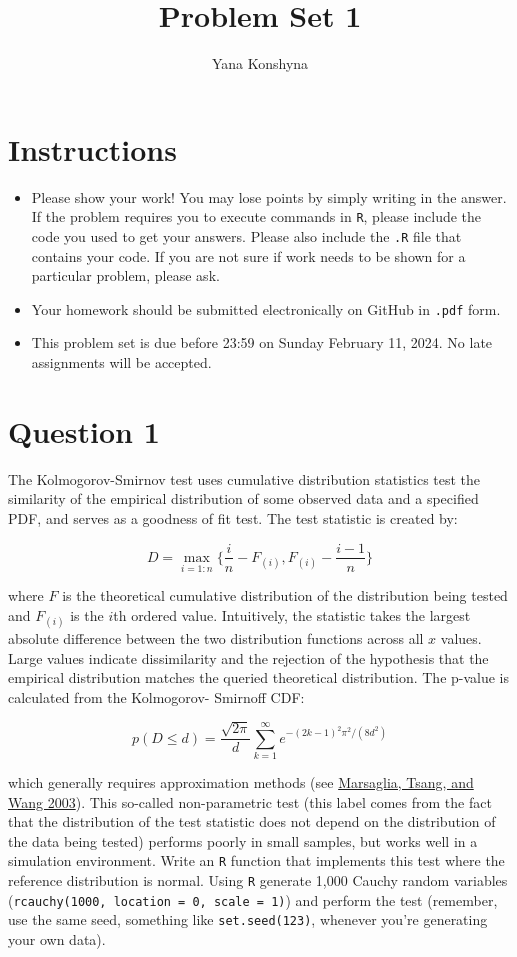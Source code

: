 \documentclass[12pt,letterpaper]{article}
\title{Problem Set 1}
\author{Yana Konshyna}
\begin{document}
	\maketitle
	\section*{Instructions}
	\begin{itemize}
	\item Please show your work! You may lose points by simply writing in the answer. If the problem requires you to execute commands in \texttt{R}, please include the code you used to get your answers. Please also include the \texttt{.R} file that contains your code. If you are not sure if work needs to be shown for a particular problem, please ask.
\item Your homework should be submitted electronically on GitHub in \texttt{.pdf} form.
\item This problem set is due before 23:59 on Sunday February 11, 2024. No late assignments will be accepted.
	\end{itemize}

	\vspace{.25cm}
\section*{Question 1} 
\vspace{.25cm}
\noindent The Kolmogorov-Smirnov test uses cumulative distribution statistics test the similarity of the empirical distribution of some observed data and a specified PDF, and serves as a goodness of fit test. The test statistic is created by:

$$D = \max_{i=1:n} \Big\{ \frac{i}{n}  - F_{(i)}, F_{(i)} - \frac{i-1}{n} \Big\}$$

\noindent where $F$ is the theoretical cumulative distribution of the distribution being tested and $F_{(i)}$ is the $i$th ordered value. Intuitively, the statistic takes the largest absolute difference between the two distribution functions across all $x$ values. Large values indicate dissimilarity and the rejection of the hypothesis that the empirical distribution matches the queried theoretical distribution. The p-value is calculated from the Kolmogorov-
Smirnoff CDF:

$$p(D \leq d)= \frac{\sqrt {2\pi}}{d} \sum _{k=1}^{\infty }e^{-(2k-1)^{2}\pi ^{2}/(8d^{2})}$$


\noindent which generally requires approximation methods (see \href{https://core.ac.uk/download/pdf/25787785.pdf}{Marsaglia, Tsang, and Wang 2003}). This so-called non-parametric test (this label comes from the fact that the distribution of the test statistic does not depend on the distribution of the data being tested) performs poorly in small samples, but works well in a simulation environment. Write an \texttt{R} function that implements this test where the reference distribution is normal. Using \texttt{R} generate 1,000 Cauchy random variables (\texttt{rcauchy(1000, location = 0, scale = 1)}) and perform the test (remember, use the same seed, something like \texttt{set.seed(123)}, whenever you're generating your own data).\\
	
\end{document}

